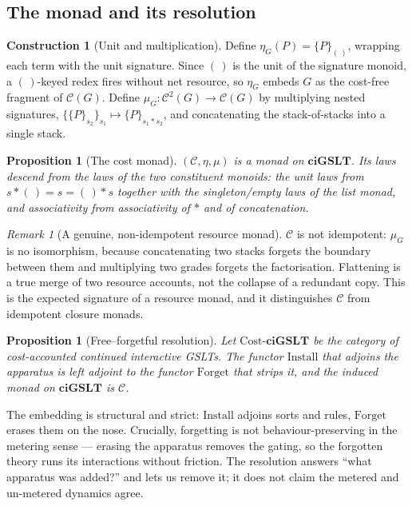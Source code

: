 \documentclass[11pt]{article}
\theoremstyle{definition}
\newtheorem{construction}[definition]{Construction}
\theoremstyle{plain}
\newtheorem{proposition}[definition]{Proposition}
\theoremstyle{remark}
\newtheorem{remark}[definition]{Remark}
\newcommand{\ciGSLT}{\mathbf{ciGSLT}}
\newcommand{\cost}{\mathcal{C}}
\begin{document}
\subsection{The monad and its resolution}

\begin{construction}[Unit and multiplication]
Define $\eta_G(P) = \{P\}_{(\,)}$, wrapping each term with the unit signature. Since
$(\,)$ is the unit of the signature monoid, a $(\,)$-keyed redex fires without net
resource, so $\eta_G$ embeds $G$ as the cost-free fragment of $\cost(G)$. Define
$\mu_G : \cost^2(G) \to \cost(G)$ by multiplying nested signatures,
$\{\{P\}_{s_2}\}_{s_1} \mapsto \{P\}_{s_1 * s_2}$, and concatenating the stack-of-stacks
into a single stack.
\end{construction}

\begin{proposition}[The cost monad]
$(\cost, \eta, \mu)$ is a monad on $\ciGSLT$. Its laws descend from the laws of the two
constituent monoids: the unit laws from $s * (\,) = s = (\,) * s$ together with the
singleton/empty laws of the list monad, and associativity from associativity of $*$ and
of concatenation.
\end{proposition}

\begin{remark}[A genuine, non-idempotent resource monad]
$\cost$ is not idempotent: $\mu_G$ is no isomorphism, because concatenating two stacks
forgets the boundary between them and multiplying two grades forgets the factorisation.
Flattening is a true merge of two resource accounts, not the collapse of a redundant
copy. This is the expected signature of a resource monad, and it distinguishes $\cost$
from idempotent closure monads.
\end{remark}

\begin{proposition}[Free--forgetful resolution]
\label{prop:cost-adjunction}
Let $\mathrm{Cost}\text{-}\ciGSLT$ be the category of cost-accounted continued
interactive GSLTs. The functor $\mathrm{Install}$ that adjoins the apparatus is left
adjoint to the functor $\mathrm{Forget}$ that strips it, and the induced monad on
$\ciGSLT$ is $\cost$.
\end{proposition}

The embedding is structural and strict: $\mathrm{Install}$ adjoins sorts and rules,
$\mathrm{Forget}$ erases them on the nose. Crucially, forgetting is not
behaviour-preserving in the metering sense --- erasing the apparatus removes the gating,
so the forgotten theory runs its interactions without friction. The resolution answers
``what apparatus was added?'' and lets us remove it; it does not claim the metered and
un-metered dynamics agree.
\end{document}
